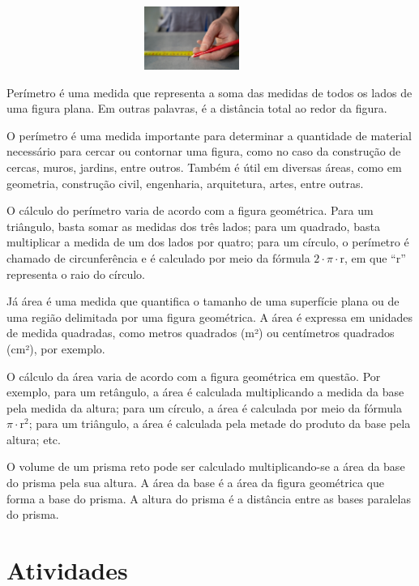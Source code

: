{{{{{\begin{figure}[H]
\centering\includegraphics[width=3.92708in,height=0.8125in]{./imgSAEB_6_MAT/media/image137.png}
\end{figure}

Perímetro é uma medida que representa a soma das medidas de todos os
lados de uma figura plana. Em outras palavras, é a distância total ao
redor da figura.

O perímetro é uma medida importante para determinar a quantidade de
material necessário para cercar ou contornar uma figura, como no caso da
construção de cercas, muros, jardins, entre outros. Também é útil em
diversas áreas, como em geometria, construção civil, engenharia,
arquitetura, artes, entre outras.

O cálculo do perímetro varia de acordo com a figura geométrica. Para um
triângulo, basta somar as medidas dos três lados; para um quadrado,
basta multiplicar a medida de um dos lados por quatro; para um círculo, o
perímetro é chamado de circunferência e é calculado por meio da fórmula
$2 \cdot \pi \cdot \text{r}$, em que ``r'' representa o raio do círculo.

Já área é uma medida que quantifica o tamanho de uma superfície plana ou de
uma região delimitada por uma figura geométrica. A área é expressa em
unidades de medida quadradas, como metros quadrados (m²) ou centímetros
quadrados (cm²), por exemplo.

O cálculo da área varia de acordo com a figura geométrica em questão.
Por exemplo, para um retângulo, a área é calculada multiplicando a
medida da base pela medida da altura; para um círculo, a área é
calculada por meio da fórmula $\pi \cdot \text{r}^2$; para um
triângulo, a área é calculada pela metade do produto da base pela
altura; etc.

O volume de um prisma reto pode ser calculado multiplicando-se a área da
base do prisma pela sua altura. 
A área da base é a área da figura geométrica que forma a base do prisma.
A altura do prisma é a distância entre as bases paralelas do prisma.}

\section*{Atividades}

}}}}
